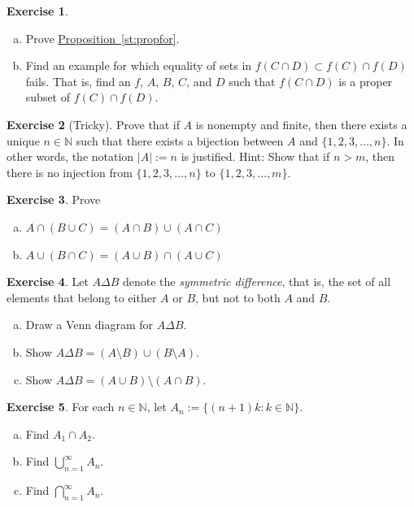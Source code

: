 \documentclass[12pt]{book}
\newcommand{\abs}[1]{\left\lvert {#1} \right\rvert}
\newcommand{\N}{{\mathbb{N}}}
\newcommand{\myindex}[1]{#1\index{#1}}
\theoremstyle{plain}
\theoremstyle{remark}
\theoremstyle{definition}
\theoremstyle{exercise}
\newtheorem{exercise}{Exercise}[section]
\theoremstyle{example}
\newcommand{\propref}[1]{\hyperref[#1]{Proposition~\ref*{#1}}}
\begin{document}
\begin{exercise}
\begin{enumerate}[a)]
\item
Prove \propref{st:propfor}.
\item
Find an example for which equality of sets
in 
$f( C \cap D) \subset f (C) \cap f (D)$
fails.  That is, find an $f$, $A$, $B$, $C$, and $D$ such that
$f( C \cap D)$ is a proper subset of $f(C) \cap f(D)$.
\end{enumerate}
\end{exercise}

\begin{exercise}[Tricky]
Prove that if $A$ is nonempty and finite, then there exists a unique
$n \in \N$ such
that there exists a bijection between $A$ and $\{ 1, 2, 3, \ldots, n \}$.
In other words, the notation $\abs{A} := n$ is justified.
Hint: Show that if $n > m$, then there is no injection from
$\{ 1, 2, 3, \ldots, n \}$ to
$\{ 1, 2, 3, \ldots, m \}$.
\end{exercise}


\begin{exercise}
Prove
\begin{enumerate}[a)]
\item $A \cap (B \cup C) = (A \cap B) \cup (A \cap C)$
\item $A \cup (B \cap C) = (A \cup B) \cap (A \cup C)$
\end{enumerate}
\end{exercise}

\begin{exercise}
Let $A \Delta B$ denote the
\emph{\myindex{symmetric difference}}, that is, the set of all elements that
belong to either $A$ or $B$, but not to both $A$ and $B$.
\begin{enumerate}[a)]
\item
Draw a Venn diagram for
$A \Delta B$.
\item
Show $A \Delta B = (A \setminus B) \cup (B \setminus A)$.
\item
Show $A \Delta B = (A \cup B) \setminus ( A \cap B)$.
\end{enumerate}
\end{exercise}

\begin{exercise}
For each $n \in \N$, let $A_n := \{ (n+1)k : k \in \N \}$.
\begin{enumerate}[a)]
\item Find $A_1 \cap A_2$.
\item Find $\bigcup_{n=1}^\infty A_n$.
\item Find $\bigcap_{n=1}^\infty A_n$.
\end{enumerate}
\end{exercise}
\end{document}
